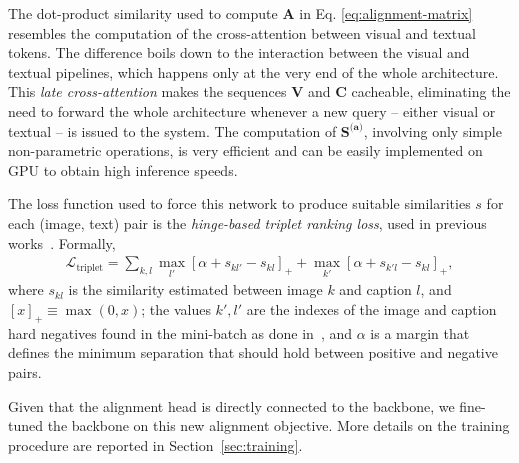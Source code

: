 \documentclass[sigconf]{acmart}
\begin{document}
The dot-product similarity used to compute $\boldsymbol{A}$ in Eq. \ref{eq:alignment-matrix} resembles the computation of the cross-attention between visual and textual tokens. The difference boils down to the interaction between the visual and textual pipelines, which happens only at the very end of the whole architecture. This \textit{late cross-attention} makes the sequences $\boldsymbol{V}$ and $\boldsymbol{C}$ cacheable, eliminating the need to forward the whole architecture whenever a new query -- either visual or textual -- is issued to the system. The computation of $\boldsymbol{S^\text{(a)}}$, involving only simple non-parametric operations, is very efficient and can be easily implemented on GPU to obtain high inference speeds.

The loss function used to force this network to produce suitable similarities $s$ for each (image, text) pair is the \textit{hinge-based triplet ranking loss}, used in previous works~\citep{vsepp2018faghri,li2019,messina2021fine}. Formally,
\begin{align}
    \mathcal{L}_\text{triplet} = \sum_{k,l} \max_{{l}'} [\alpha + s_{kl'} - s_{kl}]_+ + \max_{{k}'} [\alpha + s_{k'l} - s_{kl}]_+,  \label{eq:triplet-loss}
\end{align}
where $s_{kl}$ is the similarity estimated between image $k$ and caption $l$, and $[x]_+ \equiv \max(0, x)$; the values ${k}',{l}'$ are the indexes of the image and caption hard negatives found in the mini-batch as done in~\citep{vsepp2018faghri}, and $\alpha$ is a margin that defines the minimum separation that should hold between positive and negative pairs.

Given that the alignment head is directly connected to the backbone, we fine-tuned the backbone on this new alignment objective. More details on the training procedure are reported in Section~\ref{sec:training}.
\end{document}
